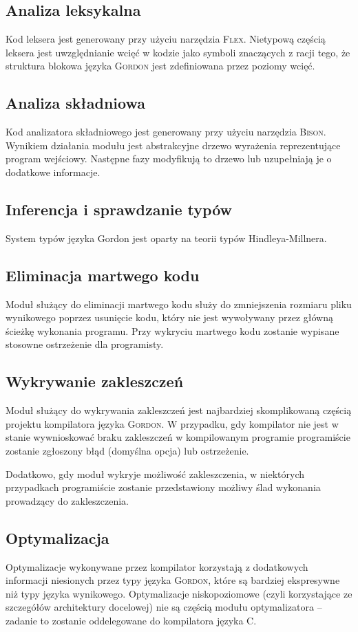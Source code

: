 \documentclass{documentation}
\begin{document}
\subsection{Analiza leksykalna}
\noindent Kod leksera jest generowany przy użyciu narzędzia \textsc{Flex}. Nietypową
częścią leksera jest uwzględnianie wcięć w kodzie jako symboli znaczących z racji tego,
że struktura blokowa języka \textsc{Gordon} jest zdefiniowana przez poziomy wcięć.

\subsection{Analiza składniowa}
\noindent Kod analizatora składniowego jest generowany przy użyciu narzędzia \textsc{Bison}.
Wynikiem działania modułu jest abstrakcyjne drzewo wyrażenia reprezentujące program wejściowy.
Następne fazy modyfikują to drzewo lub uzupełniają je o dodatkowe informacje.

\subsection{Inferencja i sprawdzanie typów}
\noindent System typów języka Gordon jest oparty na teorii typów Hindleya-Millnera. 

\subsection{Eliminacja martwego kodu}
\noindent Moduł służący do eliminacji martwego kodu służy do zmniejszenia rozmiaru pliku wynikowego
poprzez usunięcie kodu, który nie jest wywoływany przez główną ścieżkę wykonania programu.
Przy wykryciu martwego kodu zostanie wypisane stosowne ostrzeżenie dla programisty.

\subsection{Wykrywanie zakleszczeń}
\noindent Moduł służący do wykrywania zakleszczeń jest najbardziej skomplikowaną częścią projektu
kompilatora języka \textsc{Gordon}. W przypadku, gdy kompilator nie jest w stanie wywnioskować
braku zakleszczeń w kompilowanym programie programiście zostanie zgłoszony błąd (domyślna opcja)
lub ostrzeżenie.

Dodatkowo, gdy moduł wykryje możliwość zakleszczenia, w niektórych przypadkach programiście
zostanie przedstawiony możliwy ślad wykonania prowadzący do zakleszczenia. 

\subsection{Optymalizacja}
\noindent Optymalizacje wykonywane przez kompilator korzystają z dodatkowych informacji
niesionych przez typy języka \textsc{Gordon}, które są bardziej ekspresywne niż typy języka
wynikowego.
Optymalizacje niskopoziomowe (czyli korzystające ze szczegółów architektury docelowej) nie
są częścią modułu optymalizatora -- zadanie to zostanie oddelegowane do kompilatora języka \textsc{C}.
\end{document}

